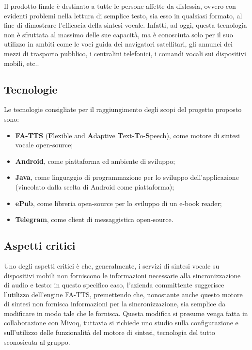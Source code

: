 Il prodotto finale è destinato a tutte le persone affette da dislessia, ovvero con evidenti problemi nella lettura di semplice testo, sia esso in qualsiasi formato, al fine di dimostrare l'efficacia della sintesi vocale. Infatti, ad oggi, questa tecnologia non è sfruttata al massimo delle sue capacità, ma è conosciuta solo per il suo utilizzo
in ambiti come le voci guida dei navigatori satellitari, gli annunci dei mezzi di trasporto pubblico, i centralini telefonici, i comandi vocali sui dispositivi mobili, etc..

\subsection{Tecnologie}

Le tecnologie consigliate per il raggiungimento degli scopi del progetto proposto sono:
\begin{itemize}
	\item \textbf{FA-TTS} (\textbf{F}lexible and \textbf{A}daptive \textbf{T}ext-\textbf{T}o-\textbf{S}peech),
	come motore di sintesi vocale open-source;
	\item \textbf{Android}, come piattaforma ed ambiente di sviluppo;
	\item \textbf{Java}, come linguaggio di programmazione per lo sviluppo dell'applicazione
	(vincolato dalla scelta di Android come piattaforma);
	\item \textbf{ePub}, come libreria open-source per lo sviluppo di un e-book
	reader;
	\item \textbf{Telegram}, come client di messaggistica open-source.
\end{itemize}

\subsection{Aspetti critici}

Uno degli aspetti critici è che, generalmente, i servizi di sintesi vocale su dispositivi mobili non forniscono le informazioni necessarie
alla sincronizzazione di audio e testo: in questo specifico caso,
l'azienda committente suggerisce l'utilizzo dell'engine FA-TTS,
premettendo che, nonostante anche questo motore di sintesi non fornisca
informazioni per la sincronizzazione, sia semplice da modificare in
modo tale che le fornisca. Questa modifica si presume venga fatta in collaborazione con Mivoq,
tuttavia si richiede uno studio sulla configurazione e sull'utilizzo delle funzionalità del motore di sintesi, tecnologia del tutto sconosicuta al gruppo. 

